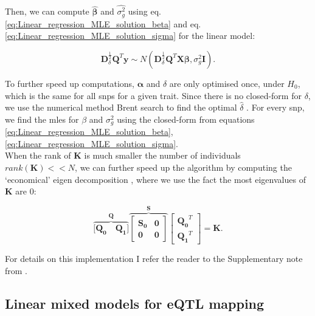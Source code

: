 Then, we can compute $\hat{\boldsymbol{\beta}}$ and $\hat{\sigma_g^2}$ using eq. \eqref{eq:Linear_regression_MLE_solution_beta} and eq. \eqref{eq:Linear_regression_MLE_solution_sigma} for the linear model:

\begin{equation}
    \mathbf{D}^{\frac{1}{2}}_{\delta}\mathbf{Q}^{T}\mathbf{y} \sim N(\mathbf{D}^{\frac{1}{2}}_{\delta}\mathbf{Q}^{T}\mathbf{X}\boldsymbol{\beta}, \sigma_g^2\mathbf{I}).
\end{equation}


To further speed up computations, $\boldsymbol{\alpha}$ and $\delta$ are only optimised once, under $H_0$, which is the same for all \gls{snp}s for a given trait.
Since there is no closed-form for $\delta$, we use the numerical method Brent search to find the optimal $\hat{\delta}$ \cite{goddard2009estimating}.
For every \gls{snp}, we find the \gls{mle}s for $\beta$ and $\sigma^2_g$ using the closed-form from equations \eqref{eq:Linear_regression_MLE_solution_beta},\eqref{eq:Linear_regression_MLE_solution_sigma}.\\

When the rank of $\mathbf{K}$ is much smaller the number of individuals $rank(\mathbf{K}) << N$,  we can further speed up the algorithm by computing the `economical' eigen decomposition \cite{lippert2011fast}, where we use the fact the most eigenvalues of $\mathbf{K}$ are 0:

\begin{equation}\label{eq:economic_eigen_decomposition}
    \overbrace{[\mathbf{Q_0} \quad \mathbf{Q_1]}}^{\mathbf{Q}}
            \overbrace{\left[\begin{array}{cc}
                \mathbf{S_0} & \mathbf{0}\\
                        \mathbf{0} & \mathbf{0}
            \end{array}\right]}^{\mathbf{S}}
        \left[\begin{array}{c}
            \mathbf{Q_0}^T \\
            \mathbf{Q_1}^T
        \end{array}\right] = \mathbf{K}.
\end{equation}

For details on this implementation I refer the reader to the Supplementary note from \cite{lippert2011fast}.


\subsection{Linear mixed models for eQTL mapping}

